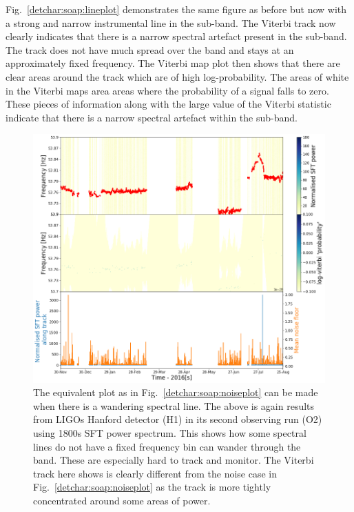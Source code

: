 Fig.~\ref{detchar:soap:lineplot} demonstrates the same figure as before but now with a strong and narrow instrumental line in the sub-band. 
The Viterbi track now clearly indicates that there is a narrow spectral artefact present in the sub-band. The track does not have much spread over the band and stays at an approximately fixed frequency. 
The Viterbi map plot then shows that there are clear areas around the track which are of high log-probability. 
The areas of white in the Viterbi maps area areas where the probability of a signal falls to zero. 
These pieces of information along with the large value of the Viterbi statistic indicate that there is a narrow spectral artefact within the sub-band. 
%
\begin{figure}
	\centering
	\includegraphics[width=\textwidth]{C5_detchar/track_F53_7_53_9_wander.png}
	\caption[Example SOAP output for wandering line.]{The equivalent plot as in Fig.~\ref{detchar:soap:noiseplot} can be made when there is a wandering spectral line. The above is again results from \glspl{LIGO} Hanford detector (H1) in its second observing run (O2) using 1800s \gls{SFT} power spectrum. This shows how some spectral lines do not have a fixed frequency bin can wander through the band. These are especially hard to track and monitor. The Viterbi track here shows is clearly different from the noise case in Fig.~\ref{detchar:soap:noiseplot} as the track is more tightly concentrated around some areas of power. }
	\label{detchar:soap:wanderplot}
\end{figure}
%

